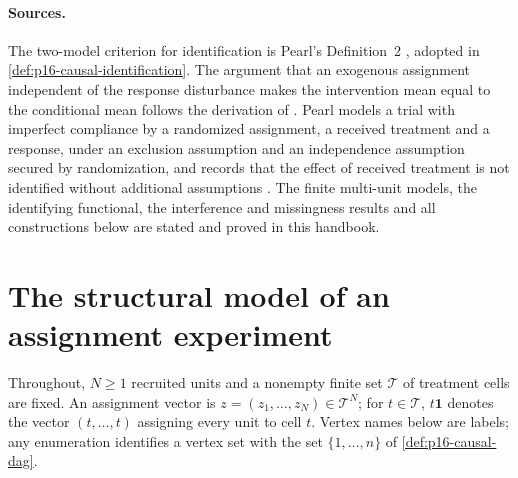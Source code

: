 \paragraph{Sources.}
The two-model criterion for identification is Pearl's Definition~2
\cite[sec.~3.2.1, p.~109]{Pearl2009CausalOverview}, adopted in
\cref{def:p16-causal-identification}. The argument that an exogenous
assignment independent of the response disturbance makes the intervention
mean equal to the conditional mean follows the derivation of
\cite[sec.~3.2.2, eqs.~(11)--(13), p.~109]{Pearl2009CausalOverview}.
Pearl models a trial with imperfect compliance by a randomized assignment,
a received treatment and a response, under an exclusion assumption and an
independence assumption secured by randomization, and records that the
effect of received treatment is not identified without additional
assumptions \cite[sec.~3.5.2, pp.~122--124]{Pearl2009CausalOverview}.
The finite multi-unit models, the identifying functional, the interference
and missingness results and all constructions below are stated and proved in
this handbook.

\section{The structural model of an assignment experiment}
\label{sec:p15-w02b-p15-077-model}

Throughout, \(N\geq1\) recruited units and a nonempty finite set
\(\mathcal T\) of treatment cells are fixed. An assignment vector is
\(z=(z_1,\ldots,z_N)\in\mathcal T^N\); for \(t\in\mathcal T\),
\(t\mathbf 1\) denotes the vector \((t,\ldots,t)\) assigning every unit to
cell \(t\). Vertex names below are labels; any enumeration identifies a
vertex set with the set \(\{1,\ldots,n\}\) of \cref{def:p16-causal-dag}.

